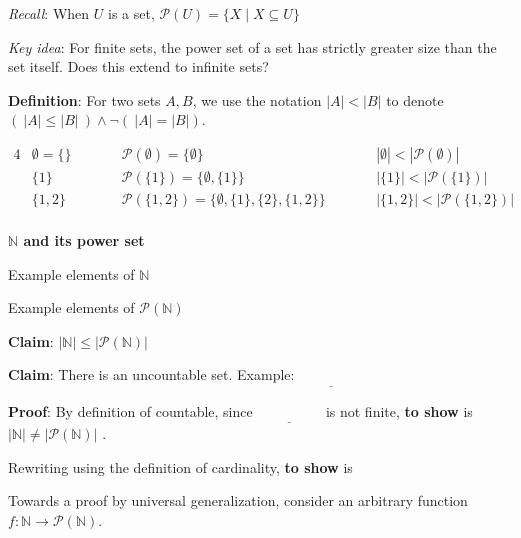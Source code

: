 \documentclass[12pt, oneside]{article}
\begin{document}
{\it Recall}: When $U$ is a set, $\mathcal{P}(U) = \{ X \mid X \subseteq U\}$

{\it Key idea}: For finite sets, the power set of a set has strictly greater size than the set itself.
Does this extend to infinite sets?

{\bf Definition}: For two sets $A, B$, we use the notation $|A| < |B|$ to denote
$(~|A| \leq |B| ~) \land \lnot (~|A| = |B|)$.

\begin{alignat*}{4}
    &\emptyset = \{ \} \qquad &&\mathcal{P}(\emptyset) = \{ \emptyset \} \qquad &&|\emptyset| < |\mathcal{P}(\emptyset)| \\
    &\{1 \} \qquad &&\mathcal{P}(\{1\}) = \{ \emptyset, \{1\} \} \qquad &&|\{1\}| < |\mathcal{P}(\{1\})| \\
    &\{1,2 \} \qquad &&\mathcal{P}(\{1,2\}) = \{ \emptyset, \{1\}, \{2\}, \{1,2\} \} \qquad &&|\{1,2\}| < |\mathcal{P}(\{1,2\})| \\
\end{alignat*}

{\bf $\mathbb{N}$ and its power set}

Example elements of $\mathbb{N}$ 

\vspace{20pt}

Example elements of $\mathcal{P}(\mathbb{N})$

\vspace{20pt}

{\bf Claim}: $| \mathbb{N} | \leq |\mathcal{P} ( \mathbb{N} ) |$

\vspace{100pt}
\newpage
{\bf Claim}: There is an uncountable set.  Example: $\underline{\phantom{~~~\mathcal{P}(\mathbb{N})~~~}}$

{\bf Proof}:  By definition of countable, since $\underline{\phantom{~~~\mathcal{P}(\mathbb{N})~~~}}$
is not finite, {\bf to show} is $|\mathbb{N}| \neq  |\mathcal{P}(\mathbb{N})|$ .

Rewriting using  the definition of  cardinality, {\bf to show} is




Towards a proof by  universal generalization,  consider  an arbitrary function $f:  \mathbb{N} \to\mathcal{P}(\mathbb{N})$.
\end{document}
